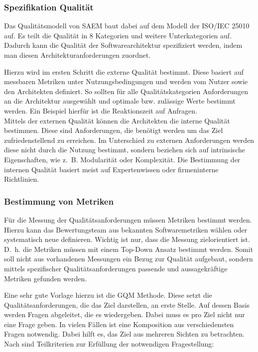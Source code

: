 \subsubsection{Spezifikation Qualität}
Das Qualitätsmodell von \ac{SAEM} baut dabei auf dem Modell der ISO/IEC 25010 auf. Es teilt die Qualität in 8 Kategorien und weitere Unterkategorien auf\cite{ISOIEC25010}. Dadurch kann die Qualität der Softwarearchitektur spezifiziert werden, indem man diesen Architekturanforderungen zuordnet.


Hierzu wird im ersten Schritt die externe Qualität bestimmt. Diese basiert auf messbaren Metriken unter Nutzungsbedingungen und werden vom Nutzer sowie den Architekten definiert\cite{Duenas1998}. So sollten für alle Qualitätskategorien Anforderungen an die Architektur ausgewählt und optimale bzw. zulässige Werte bestimmt werden. Ein Beispiel hierfür ist die Reaktionszeit auf Anfragen.\\ 
Mittels der externen Qualität können die Architekten die interne Qualität bestimmen. Diese sind Anforderungen, die benötigt werden um das Ziel zufriedenstellend zu erreichen. Im Unterschied zu externen Anforderungen werden diese nicht durch die Nutzung bestimmt, sondern beziehen sich auf intrinsische Eigenschaften, wie z.~B. Modularität oder Komplexität\cite{Duenas1998}. Die Bestimmung der internen Qualität basiert meist auf Expertenwissen oder firmeninterne Richtlinien.

\subsubsection{Bestimmung von Metriken}
Für die Messung der Qualitätsanforderungen müssen Metriken bestimmt werden. Hierzu kann das Bewertungsteam aus bekannten Softwaremetriken wählen oder systematisch neue definieren. Wichtig ist nur, dass die Messung zielorientiert ist. D. h. die Metriken müssen mit einem Top-Down Ansatz bestimmt werden\cite{Habenicht2008}. Somit soll nicht aus vorhandenen Messungen ein Bezug zur Qualität aufgebaut, sondern mittels spezifischer Qualitätsanforderungen passende und aussagekräftige Metriken gefunden werden.

Eine sehr gute Vorlage hierzu ist die \ac{GQM} Methode. Diese setzt die Qualitätsanforderungen, die das Ziel darstellen, an erste Stelle. Auf dessen Basis werden Fragen abgeleitet, die es wiedergeben. Dabei muss es pro Ziel nicht nur eine Frage geben. In vielen Fällen ist eine Komposition aus verschiedensten Fragen notwendig. Dabei hilft es, das Ziel aus mehreren Sichten zu betrachten. Nach\cite{Habenicht2008}
sind Teilkriterien zur Erfüllung der notwendigen Fragestellung:
 
